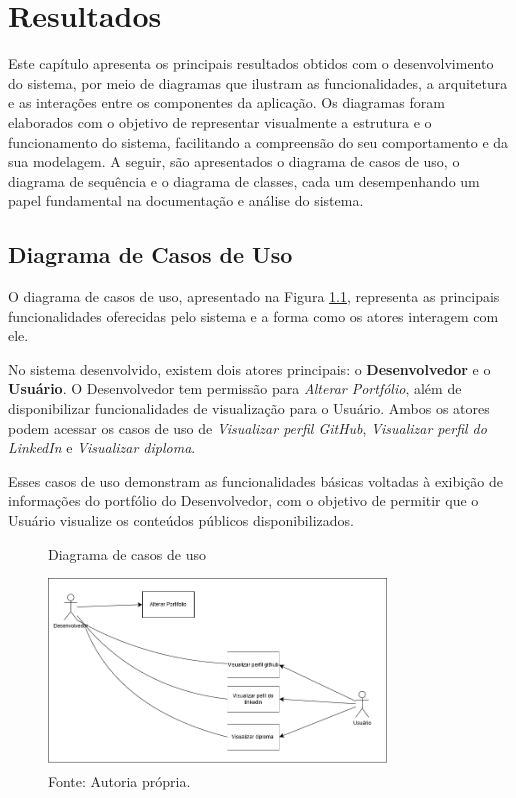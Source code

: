\chapter{Resultados}
\label{chap:result}

Este capítulo apresenta os principais resultados obtidos com o desenvolvimento do sistema, por meio de diagramas que ilustram as funcionalidades, a arquitetura e as interações entre os componentes da aplicação. Os diagramas foram elaborados com o objetivo de representar visualmente a estrutura e o funcionamento do sistema, facilitando a compreensão do seu comportamento e da sua modelagem. A seguir, são apresentados o diagrama de casos de uso, o diagrama de sequência e o diagrama de classes, cada um desempenhando um papel fundamental na documentação e análise do sistema.



\section{Diagrama de Casos de Uso}
\label{sec:casos}

O diagrama de casos de uso, apresentado na Figura \ref{fig:diagrama_uso}, representa as principais funcionalidades oferecidas pelo sistema e a forma como os atores interagem com ele. 

No sistema desenvolvido, existem dois atores principais: o \textbf{Desenvolvedor} e o \textbf{Usuário}. O Desenvolvedor tem permissão para \textit{Alterar Portfólio}, além de disponibilizar funcionalidades de visualização para o Usuário. Ambos os atores podem acessar os casos de uso de \textit{Visualizar perfil GitHub}, \textit{Visualizar perfil do LinkedIn} e \textit{Visualizar diploma}. 

Esses casos de uso demonstram as funcionalidades básicas voltadas à exibição de informações do portfólio do Desenvolvedor, com o objetivo de permitir que o Usuário visualize os conteúdos públicos disponibilizados.

\begin{figure}[h!]	
    \centering
    \caption{Diagrama de casos de uso}
    \includegraphics[width=0.8\textwidth]{Figures/diagrama_caso_uso.drawio.png}
    \caption*{Fonte: Autoria própria.}
    \label{fig:diagrama_uso}
\end{figure}

